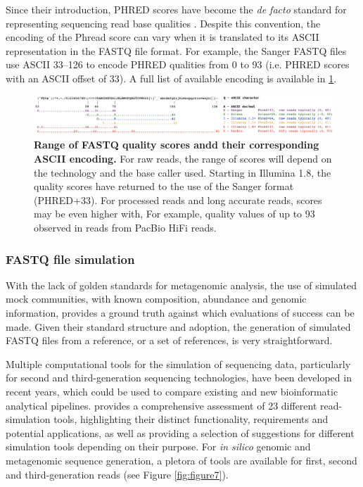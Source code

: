 Since their introduction, PHRED scores have become the \textit{de facto} standard for representing sequencing read base qualities \citep{cock_sanger_2010}. Despite this convention, the encoding of the Phread score can vary when it is translated to its ASCII representation in the FASTQ file format. For example, the Sanger FASTQ files use ASCII 33–126 to encode PHRED qualities from 0 to 93 (i.e. PHRED scores with an ASCII offset of 33). A full list of available encoding is available in \ref{fig:figure6}. 

\begin{figure}[h!]
\centering
\includegraphics[width=\textwidth]{figures/introduction/Figure 6.png}
\caption{\textbf{Range of FASTQ quality scores andd their corresponding ASCII encoding.} For raw reads, the range of scores will depend on the technology and the base caller used. Starting in Illumina 1.8, the quality scores have returned to the use of the Sanger format (PHRED+33). For processed reads and long accurate reads, scores may be even higher with, For example, quality values of up to 93 observed in reads from PacBio HiFi reads.}
\label{fig:figure6}
\end{figure}

\subsubsection{FASTQ file simulation} \label{ssec:fastq_sim}

With the lack of golden standards for metagenomic analysis, the use of simulated mock communities, with known composition, abundance and genomic information, provides a ground truth against which evaluations of success can be made. Given their standard structure and adoption, the generation of simulated FASTQ files from a reference, or a set of references, is very straightforward. 

Multiple computational tools for the simulation of sequencing data, particularly for second and third-generation sequencing technologies, have been developed in recent years, which could be used to compare existing and new bioinformatic analytical pipelines. \cite{escalona_comparison_2016} provides a comprehensive assessment of 23 different read-simulation tools,  highlighting their distinct functionality, requirements and potential applications, as well as providing a selection of suggestions for different simulation tools depending on their purpose. For \textit{in silico} genomic and metagenomic sequence generation, a pletora of tools are available for first, second and third-generation reads (see Figure \ref{fig:figure7}).

